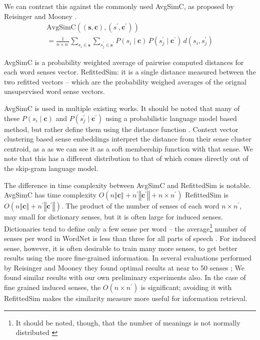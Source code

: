 \documentclass{sig-alternate}
\renewcommand{\c}{\mathbf{c}}
\newcommand{\s}{\mathbf{s}}
\begin{document}
We can contrast this against the commonly used AvgSimC, as proposed by Reisinger and Mooney \parencite{Reisinger2010}.
\begin{multline}
\mathrm{AvgSimC}((\s,\c),(s^{\prime},\c^{\prime})) \\
=  \frac{1}{n \times n^{\prime}}
\sum_{s_{i}\in\s}
\sum_{s_{j}^{\prime}\in\s^{\prime}}
P(s_{i}\mid\c)\,P(s_{j}^{\prime}\mid\c^{\prime})\,d(s_{i},s_{j}^{\prime})
\end{multline}

AvgSimC is a probability weighted average of pairwise computed distances for each word senses vector.
RefittedSim: it is a single distance measured between the two refitted vectors -- which are the probability weighed averages of the orignal unsupervised word sense vectors.

AvgSimC is used in multiple existing works. It should be noted that many of these  $P(s_{i}\mid\c)$ and $P(s_{j}^{\prime}\mid\c^\prime)$ using a probabilistic language model based method, but rather define them using the distance function \parencite{Reisinger2010, Huang2012}. Context vector clustering based sense embeddings interpret the distance from their sense cluster centroid, as a as we can see it as a soft membership function with that sense. We note that this has a different distribution to that of which comes directly out of the skip-gram language model.



The difference in time complexity between AvgSimC and RefittedSim is notable.
AvgSimC has time complexity $O(n\left\Vert \c\right\Vert +n^{\prime}\left\Vert \c^{\prime}\right\Vert +n\times n^{\prime})$
RefittedSim is $O(n\left\Vert \c\right\Vert +n^{\prime}\left\Vert \c^{\prime}\right\Vert)$.
The product of the number of senses of each word $n \times n^\prime$, may small for dictionary senses, but it is often large for induced senses. Dictionaries tend to define only a few sense per word -- the average\footnote{It should be noted, though, that the number of meanings is not normally distributed \parencite{zipf1945meaning}} number of senses per word in WordNet is less than three for all parts of speech \parencite{miller1995wordnet}. For induced sense, however, it is often desirable to train many more senses, to get better results using the more fine-grained information. In several evaluations performed by Reisinger and Mooney they found optimal results at near to 50 senses \parencite{Reisinger2010}; We found similar results with our own preliminary experiments also. In the case of fine grained induced senses, the $O(n \times n^\prime)$ is significant; avoiding it with RefittedSim makes the similarity measure more useful for information retrieval.
\end{document}
